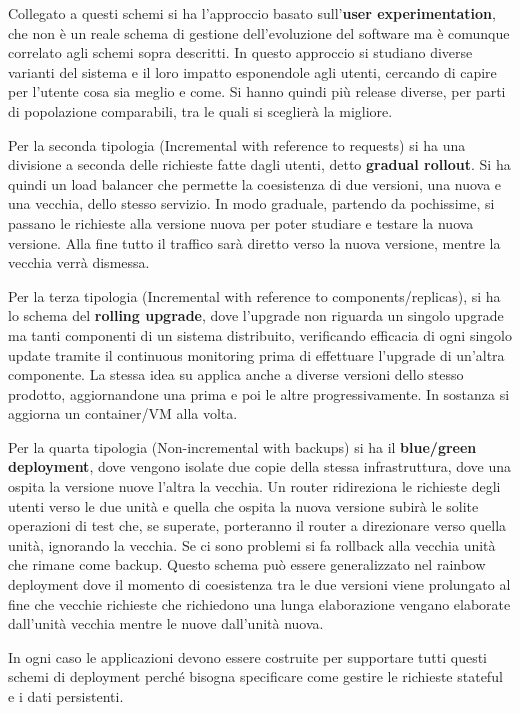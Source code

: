 Collegato a questi schemi si ha l'approccio basato sull'\textbf{user experimentation},
che non è un reale schema di gestione dell'evoluzione del software ma è comunque
correlato agli schemi sopra descritti. In questo approccio si studiano diverse
varianti del sistema e il loro impatto esponendole agli utenti, cercando di capire
per l'utente cosa sia meglio e come. Si hanno quindi più release diverse, per
parti di popolazione comparabili, tra le quali si sceglierà la migliore.

Per la seconda tipologia (Incremental with reference to requests) si ha una
divisione a seconda delle richieste fatte dagli utenti, detto \textbf{gradual rollout}.
Si ha quindi un load balancer che permette la coesistenza di due versioni, una
nuova e una vecchia, dello stesso servizio. In modo graduale, partendo da pochissime,
si passano le richieste alla versione nuova per poter studiare e testare la nuova
versione. Alla fine tutto il traffico sarà diretto verso la nuova versione, mentre
la vecchia verrà dismessa.

Per la terza tipologia (Incremental with reference to components/replicas),
si ha lo schema del \textbf{rolling upgrade}, dove l'upgrade non riguarda un
singolo upgrade ma tanti componenti di un sistema distribuito, verificando efficacia
di ogni singolo update tramite il continuous monitoring prima di effettuare l'upgrade
di un'altra componente. La stessa idea su applica anche a diverse versioni dello
stesso prodotto, aggiornandone una prima e poi le altre progressivamente. In
sostanza si aggiorna un container/VM alla volta.

Per la quarta tipologia (Non-incremental with backups) si ha il
\textbf{blue/green deployment}, dove vengono isolate due copie della stessa
infrastruttura, dove una ospita la versione nuove l'altra la vecchia. Un router
ridireziona le richieste degli utenti verso le due unità e quella che ospita la
nuova versione subirà le solite operazioni di test che, se superate, porteranno
il router a direzionare verso quella unità, ignorando la vecchia. Se ci sono problemi
si fa rollback alla vecchia unità che rimane come backup. Questo schema può essere
generalizzato nel rainbow deployment dove il momento di coesistenza tra le due
versioni viene prolungato al fine che vecchie richieste che richiedono una lunga
elaborazione vengano elaborate dall'unità vecchia mentre le nuove dall'unità nuova.

In ogni caso le applicazioni devono essere costruite per supportare tutti questi
schemi di deployment perché bisogna specificare come gestire le richieste stateful
e i dati persistenti.
